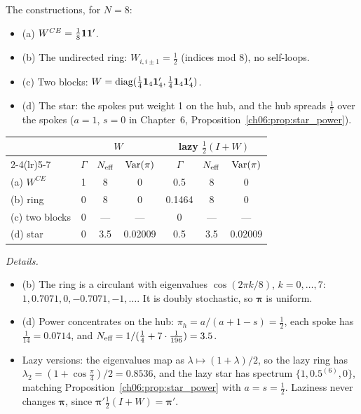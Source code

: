 \documentclass[../solutions_manual.tex]{subfiles}
\begin{document}

The constructions, for $N = 8$:
\begin{itemize}
\item (a) $W^{CE} = \frac18\mathbf{1}\mathbf{1}'$.
\item (b) The undirected ring: $W_{i,i\pm1} = \frac12$ (indices mod 8), no self-loops.
\item (c) Two blocks: $W = \text{diag}(\frac14\mathbf{1}_4\mathbf{1}_4', \frac14\mathbf{1}_4\mathbf{1}_4')$.
\item (d) The star: the spokes put weight 1 on the hub, and the hub spreads $\frac17$ over the spokes ($a = 1$, $s = 0$ in Chapter~6, Proposition~\ref{ch06:prop:star_power}).
\end{itemize}
\begin{center}
\begin{tabular}{lcccccc}
\toprule
& \multicolumn{3}{c}{$W$} & \multicolumn{3}{c}{lazy $\frac12(I + W)$}\\
\cmidrule(lr){2-4}\cmidrule(lr){5-7}
& $\Gamma$ & $N_{\text{eff}}$ & $\operatorname{Var}(\pi)$ & $\Gamma$ & $N_{\text{eff}}$ & $\operatorname{Var}(\pi)$ \\
\midrule
(a) $W^{CE}$ & 1 & 8 & 0 & 0.5 & 8 & 0\\
(b) ring & 0 & 8 & 0 & 0.1464 & 8 & 0 \\
(c) two blocks & 0 & --- & --- & 0 & --- & --- \\
(d) star & 0 & 3.5 & 0.02009 & 0.5 & 3.5 & 0.02009 \\
\bottomrule
\end{tabular}
\end{center}

\emph{Details.}
\begin{itemize}
\item (b) The ring is a circulant with eigenvalues $\cos(2\pi k/8)$, $k = 0, \ldots, 7$: $1, 0.7071, 0, -0.7071, -1, \ldots$. It is doubly stochastic, so $\boldsymbol\pi$ is uniform.
\item (d) Power concentrates on the hub: $\pi_h = a/(a + 1 - s) = \frac12$, each spoke has $\frac{1}{14} = 0.0714$, and $N_{\text{eff}} = 1/(\frac14 + 7\cdot\frac{1}{196}) = 3.5$.
\item Lazy versions: the eigenvalues map as $\lambda \mapsto (1+\lambda)/2$, so the lazy ring has $\lambda_2 = (1 + \cos\frac\pi4)/2 = 0.8536$, and the lazy star has spectrum $\{1, 0.5^{(6)}, 0\}$, matching Proposition~\ref{ch06:prop:star_power} with $a = s = \frac12$. Laziness never changes $\boldsymbol\pi$, since $\boldsymbol\pi'\frac12(I+W) = \boldsymbol\pi'$.
\end{itemize}
\end{document}
